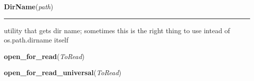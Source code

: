     \label{System:Utils:DirName}

    \vspace{0.5ex}

\hspace{.8\funcindent}\begin{boxedminipage}{\funcwidth}

    \raggedright \textbf{DirName}(\textit{path})

    \vspace{-1.5ex}

    \rule{\textwidth}{0.5\fboxrule}
\setlength{\parskip}{2ex}
    utility that gets dir name;  sometimes this is the right thing to use 
    intead of os.path.dirname itself

\setlength{\parskip}{1ex}
    \end{boxedminipage}

    \label{System:Utils:open_for_read}

    \vspace{0.5ex}

\hspace{.8\funcindent}\begin{boxedminipage}{\funcwidth}

    \raggedright \textbf{open\_for\_read}(\textit{ToRead})

\setlength{\parskip}{2ex}
\setlength{\parskip}{1ex}
    \end{boxedminipage}

    \label{System:Utils:open_for_read_universal}

    \vspace{0.5ex}

\hspace{.8\funcindent}\begin{boxedminipage}{\funcwidth}

    \raggedright \textbf{open\_for\_read\_universal}(\textit{ToRead})

\setlength{\parskip}{2ex}
\setlength{\parskip}{1ex}
    \end{boxedminipage}

    \label{System:Utils:open_for_write}

